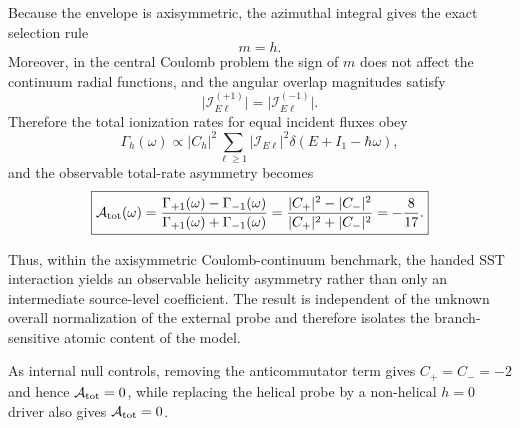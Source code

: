 \documentclass[11pt,a4paper]{article}
\begin{document}
        Because the envelope is axisymmetric, the azimuthal integral gives the exact selection rule
        \begin{equation}
            m=h.
        \end{equation}
        Moreover, in the central Coulomb problem the sign of $m$ does not affect the continuum radial functions, and the angular overlap magnitudes satisfy
        \begin{equation}
            \bigl|\mathcal I_{E\ell}^{(+1)}\bigr|
            =
            \bigl|\mathcal I_{E\ell}^{(-1)}\bigr|.
        \end{equation}
        Therefore the total ionization rates for equal incident fluxes obey
        \begin{equation}
            \Gamma_h(\omega)
            \propto
            |C_h|^2
            \sum_{\ell\ge 1}
            \bigl|\mathcal I_{E\ell}\bigr|^2
            \delta(E+I_1-\hbar\omega),
        \end{equation}
        and the observable total-rate asymmetry becomes
        \begin{equation}
            \boxed{
                \mathcal A_{\rm tot}(\omega)
                =
                \frac{\Gamma_{+1}(\omega)-\Gamma_{-1}(\omega)}
                {\Gamma_{+1}(\omega)+\Gamma_{-1}(\omega)}
                =
                \frac{|C_+|^2-|C_-|^2}{|C_+|^2+|C_-|^2}
                =
                -\frac{8}{17}.
            }
        \end{equation}
        
        Thus, within the axisymmetric Coulomb-continuum benchmark, the handed SST interaction yields an observable helicity asymmetry rather than only an intermediate source-level coefficient. The result is independent of the unknown overall normalization of the external probe and therefore isolates the branch-sensitive atomic content of the model.
        
        As internal null controls, removing the anticommutator term gives $C_+=C_-=-2$ and hence $\mathcal A_{\rm tot}=0$, while replacing the helical probe by a non-helical $h=0$ driver also gives $\mathcal A_{\rm tot}=0$.
        
\end{document}
